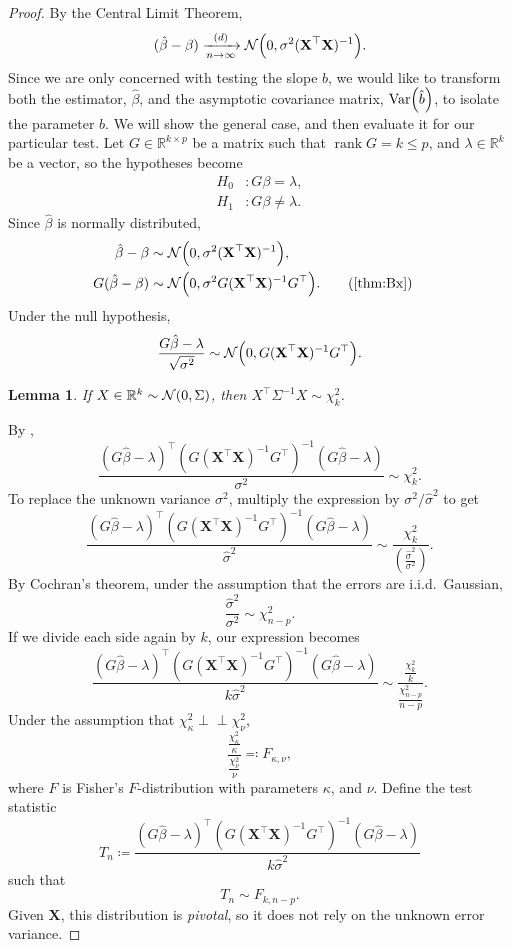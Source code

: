 \documentclass[letterpaper, reqno]{amsart}
\newtheorem{lemma}[theorem]{Lemma}
\numberwithin{equation}{section}
\newcommand{\T}{\top} %
\newcommand{\vect}[1]{\boldsymbol{\mathbf{#1}}} %
\newcommand{\ddfrac}[2]{\frac{\displaystyle #1}{\displaystyle #2}}
\newcommand{\Var}[1]{\operatorname{Var}\mleft(#1\mright)}
\newcommand{\R}{\mathbb{R}}  %
\newcommand{\N}[2]{\mathcal{N}\mleft( #1, #2 \mright)}
\newcommand{\indep}{\perp \!\!\! \perp}  %
\newcommand{\iid}{i.i.d.}
\newcommand{\by}[1]{&\quad&\text{(#1)}}
\newcommand{\Dlim}{\xrightarrow[n \to \infty]{(d)}}
\newcommand{\Xm}{\vect{X}}
\newcommand{\Bv}{\beta}
\newcommand{\Bvh}{\hat{\beta}}
\DeclareMathOperator{\rank}{rank}
\begin{document}
\begin{proof}
  By the Central Limit Theorem,
  \[ (\Bvh - \Bv) \Dlim \N{0}{\sigma^2 (\Xm^\T\Xm)^{-1}}. \]
  Since we are only concerned with testing the slope $b$, we would like to
  transform both the estimator, $\Bvh$, and the asymptotic covariance matrix,
  $\Var{\hat{b}}$, to isolate the parameter $b$.
  We will show the general case, and then evaluate it for our particular test.
  Let $G \in \R^{k \times p}$ be a matrix such that $\rank G = k \le p$,
  and $\lambda \in \R^k$ be a vector, so the hypotheses become
  \begin{align*}
    H_0 &\colon G\Bv = \lambda, \\
    H_1 &\colon G\Bv \ne \lambda.
  \end{align*}
  Since $\Bvh$ is normally distributed,
  \begin{alignat*}{3}
    \Bvh - \Bv &\sim \N{0}{\sigma^2 (\Xm^\T \Xm)^{-1}}, \\
    G(\Bvh - \Bv) &\sim \N{0}{\sigma^2 G (\Xm^\T \Xm)^{-1} G^\T}. \by{\Cref{thm:Bx}}
  \end{alignat*}
  Under the null hypothesis,
  \[ \frac{G\Bvh - \lambda}{\sqrt{\sigma^2}} \sim \N{0}{G (\Xm^\T \Xm)^{-1} G^\T}. \]

  \begin{lemma} \label{lem:norm2chi}
    If $X \in \R^k \sim \N{0}{\Sigma}$, then $X^\T \Sigma^{-1} X \sim \chi^2_k$.
  \end{lemma}

  By ,
  \[ \frac{(G\Bvh - \lambda)^\T (G (\Xm^\T \Xm)^{-1} G^\T)^{-1} (G\Bvh - \lambda)}{\sigma^2} 
    \sim \chi^2_k. \]
  To replace the unknown variance $\sigma^2$, multiply the expression by 
  $\sigma^2/\hat{\sigma}^2$ to get
  \[ \frac{(G\Bvh - \lambda)^\T (G (\Xm^\T \Xm)^{-1} G^\T)^{-1} (G\Bvh - \lambda)}{\hat{\sigma}^2} 
    \sim \ddfrac{\chi^2_k}{\left(\frac{\hat{\sigma}^2}{\sigma^2}\right)}. \]
  By Cochran's theorem, under the assumption that the errors are \iid\ Gaussian,
  \[ \frac{\hat{\sigma}^2}{\sigma^2} \sim \chi^2_{n-p}. \]
  If we divide each side again by $k$, our expression becomes
  \[ \frac{(G\Bvh - \lambda)^\T (G (\Xm^\T \Xm)^{-1} G^\T)^{-1} (G\Bvh - \lambda)}{k \hat{\sigma}^2} 
    \sim \ddfrac{\frac{\chi^2_k}{k}}{\frac{\chi^2_{n-p}}{n-p}}. \]
  Under the assumption that $\chi^2_\kappa \indep \chi^2_\nu$,
  \[ \ddfrac{\frac{\chi^2_\kappa}{\kappa}}{\frac{\chi^2_\nu}{\nu}} \eqqcolon F_{\kappa, \nu}, \]
  where $F$ is Fisher's $F$-distribution with parameters $\kappa$, and $\nu$. 
  Define the test statistic
  \[ T_n \coloneqq \frac{(G\Bvh - \lambda)^\T (G (\Xm^\T \Xm)^{-1} G^\T)^{-1} (G\Bvh - \lambda)}
    {k \hat{\sigma}^2} \]
  such that
  \[ T_n \sim F_{k, n-p}. \]
  Given $\Xm$, this distribution is \emph{pivotal}, so it does not rely on the
  unknown error variance.


\end{proof}
\end{document}
